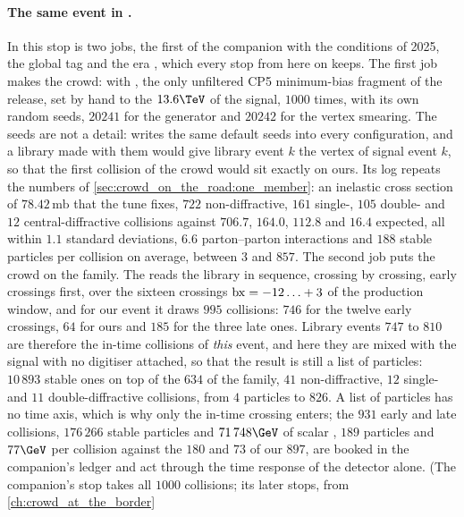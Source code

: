 \paragraph{The same event in \CMSSW.}
\label{sec:crowd_on_the_road:cmssw_event}
In \CMSSW this stop is two jobs, the first of the companion with the
conditions of 2025, the global tag 
and the era , which every \CMSSW stop from here on
keeps. The first job makes the crowd: \PYTHIA with
, the only unfiltered CP5
minimum-bias fragment of the release, set by hand to the $13.6\TeV$ of the
signal, $1000$ times, with its own random seeds, $20241$ for the generator
and $20242$ for the vertex smearing. The seeds are not a detail:
 writes the same default seeds into every
configuration, and a library made with them would give library event $k$
the vertex of signal event $k$, so that the first collision of the crowd
would sit exactly on ours. Its log repeats the numbers of
\cref{sec:crowd_on_the_road:one_member}: an inelastic cross section of
$78.42\,\mathrm{mb}$ that the tune fixes, $722$ non-diffractive, $161$
single-, $105$ double- and $12$ central-diffractive collisions against
$706.7$, $164.0$, $112.8$ and $16.4$ expected, all within $1.1$ standard
deviations, $6.6$ parton--parton interactions and $188$ stable particles
per collision on average, between $3$ and $857$. The second job puts the
crowd on the family. The \Mix reads the library in sequence, crossing by
crossing, early crossings first, over the sixteen crossings
$\mathrm{bx}=-12\ldots+3$ of the production window, and for our event it draws
$995$ collisions: $746$ for the twelve early crossings, $64$ for ours and
$185$ for the three late ones. Library events $747$ to $810$ are therefore
the in-time collisions of \emph{this} event, and here they are mixed with
the signal with no digitiser attached, so that the result is still a list
of particles: $10\,893$ stable ones on top of the $634$ of the family,
$41$ non-diffractive, $12$ single- and $11$ double-diffractive collisions,
from $4$ particles to $826$. A list of particles has no time axis, which
is why only the in-time crossing enters; the $931$ early and late
collisions, $176\,266$ stable particles and $71\,748\GeV$ of scalar \pt,
$189$ particles and $77\GeV$ per collision against the $180$ and $73$ of
our $897$, are booked in the companion's ledger and act through the time
response of the detector alone. (The companion's \GEANT stop takes all
$1000$ collisions; its later stops, from \cref{ch:crowd_at_the_border}
